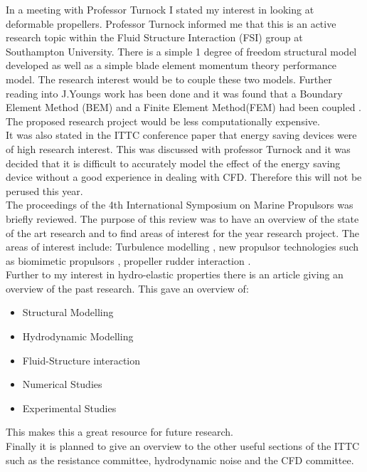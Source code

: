 \documentclass[12pt]{article}
\begin{document}
In a meeting with Professor Turnock I stated my interest in looking at deformable propellers. Professor Turnock informed me that this is an active research topic within the Fluid Structure Interaction (FSI) group at Southampton University. There is a simple 1 degree of freedom structural model developed as well as a simple blade element momentum theory performance model. The research interest would be to couple these two models. Further reading into J.Youngs work has been done and it was found that a Boundary Element Method (BEM) and a Finite Element Method(FEM) had been coupled \cite{Young2006}. The proposed research project would be less computationally expensive.
\\
It was also stated in the ITTC conference paper that energy saving devices were of high research interest. This was discussed with professor Turnock and it was decided that it is difficult to  accurately model the effect of the energy saving device without a good experience in dealing with CFD. Therefore this will not be perused this year.
\\
The proceedings of the 4th International Symposium on Marine Propulsors was briefly reviewed. The purpose of this review was to have an overview of the state of the art research and to find areas of interest for the year research project. The areas of interest include: Turbulence modelling \cite{Bonfiglio2015}, new propulsor technologies such as biomimetic propulsors \cite{Politis2015}, propeller rudder interaction \cite{Berger2015}. 
\\
Further to my interest in hydro-elastic properties there is an article giving an overview of the past research\cite{Maljaars2015}. This gave an overview of:
\begin{itemize}
\item Structural Modelling

\item Hydrodynamic Modelling

\item Fluid-Structure interaction

\item Numerical Studies

\item Experimental Studies
\end{itemize}

This makes this a great resource for future research.
\\
Finally it is planned to give an overview to the other useful sections of the ITTC such as the resistance committee, hydrodynamic noise and the CFD committee.
\\
\printbibliography 
\end{document}
